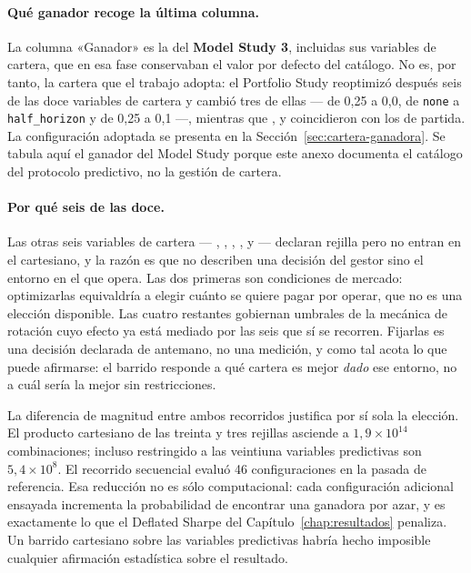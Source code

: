 \paragraph{Qué ganador recoge la última columna.} La columna «Ganador» es la del \textbf{Model
Study 3}, incluidas sus variables de cartera, que en esa fase conservaban el valor por defecto del
catálogo. No es, por tanto, la cartera que el trabajo adopta: el Portfolio Study reoptimizó después
seis de las doce variables de cartera y cambió tres de ellas ---
 de 0,25 a 0,0,  de
\texttt{none} a \texttt{half\_horizon} y  de 0,25 a 0,1 ---,
mientras que ,  y
 coincidieron con los de partida. La configuración adoptada
se presenta en la Sección~\ref{sec:cartera-ganadora}. Se tabula aquí el ganador del Model Study
porque este anexo documenta el catálogo del protocolo predictivo, no la gestión de cartera.

\paragraph{Por qué seis de las doce.} Las otras seis variables de cartera ---
, , ,
,  y
 --- declaran rejilla pero no entran en el cartesiano, y la razón
es que no describen una decisión del gestor sino el entorno en el que opera. Las dos primeras son
condiciones de mercado: optimizarlas equivaldría a elegir cuánto se quiere pagar por operar, que no
es una elección disponible. Las cuatro restantes gobiernan umbrales de la mecánica de rotación cuyo
efecto ya está mediado por las seis que sí se recorren. Fijarlas es una decisión declarada de
antemano, no una medición, y como tal acota lo que puede afirmarse: el barrido responde a qué
cartera es mejor \emph{dado} ese entorno, no a cuál sería la mejor sin restricciones.

La diferencia de magnitud entre ambos recorridos justifica por sí sola la elección. El producto
cartesiano de las treinta y tres rejillas asciende a $1{,}9 \times 10^{14}$ combinaciones; incluso
restringido a las veintiuna variables predictivas son $5{,}4 \times 10^{8}$. El recorrido secuencial
evaluó 46 configuraciones en la pasada de referencia. Esa reducción no es sólo computacional: cada
configuración adicional ensayada incrementa la probabilidad de encontrar una ganadora por azar, y es
exactamente lo que el Deflated Sharpe del Capítulo~\ref{chap:resultados} penaliza. Un barrido
cartesiano sobre las variables predictivas habría hecho imposible cualquier afirmación estadística
sobre el resultado.

